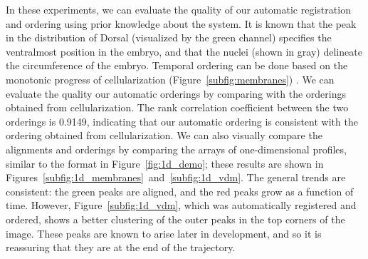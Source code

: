 \documentclass{pnastwo}
\begin{document}
\begin{article}
In these experiments, we can evaluate the quality of our automatic registration and ordering using prior knowledge about the system.
%
It is known that the peak in the distribution of Dorsal (visualized by the green channel) specifies the ventralmost position in the embryo, and that the nuclei (shown in gray) delineate the circumference of the embryo. 
%
%
Temporal ordering can be done based on the monotonic progress of cellularization (Figure~\ref{subfig:membranes}) \cite{figard2013plasma}. 
%
We can evaluate the quality our automatic orderings by comparing with the orderings obtained from cellularization.
%
The rank correlation coefficient between the two orderings is 0.9149, indicating that our automatic ordering is consistent with the ordering obtained from cellularization.
%
We can also visually compare the alignments and orderings by comparing the arrays of one-dimensional profiles, similar to the format in Figure~\ref{fig:1d_demo};
these results are shown in Figures~\ref{subfig:1d_membranes}~and~\ref{subfig:1d_vdm}.
%
The general trends are consistent:
the green peaks are aligned, and the red peaks grow as a function of time. 
%
However, Figure~\ref{subfig:1d_vdm}, which was automatically registered and ordered, shows a better clustering of the outer peaks in the top corners of the image.
%
%
These peaks are known to arise later in development, and so it is reassuring that they are at the end of the trajectory.
%



\end{article}
\end{document}
